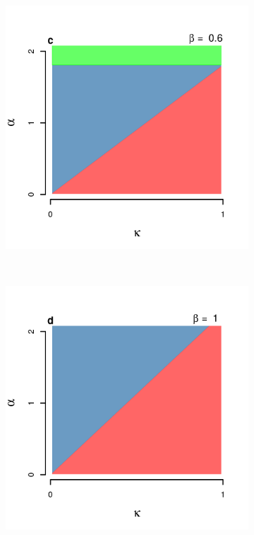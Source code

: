 \documentclass[12pt]{article}
\begin{document}
\begin{figure}[t!]
  \begin{subfigure}{0.5\textwidth}
      \includegraphics[scale=0.6]{figure_2c.png}
  \end{subfigure}%
  ~%
  \begin{subfigure}{0.5\textwidth}
      \includegraphics[scale=0.6]{figure_2d.png}
  \end{subfigure}%


\end{figure}
\end{document}

